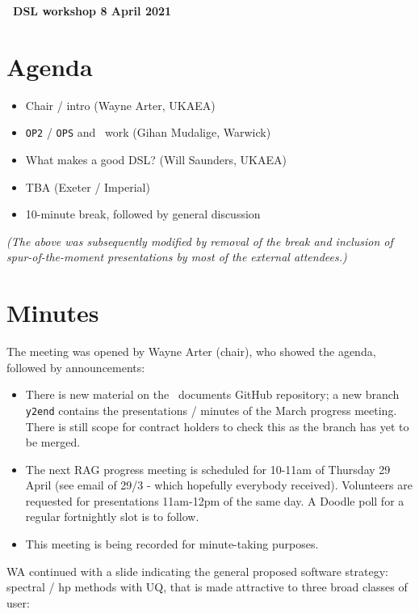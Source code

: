 \documentclass[11pt]{article}
\begin{document}
\vspace{0.2cm}

\centerline{\bf \large \textbf{\nep\  DSL workshop 8 April 2021}}

\section{Agenda}

\begin{itemize}
\item Chair / intro (Wayne Arter, UKAEA)
\item {\tt OP2} / {\tt OPS} and \nep\  work (Gihan Mudalige, Warwick)
\item What makes a good DSL? (Will Saunders, UKAEA)
\item TBA (Exeter / Imperial)
\item 10-minute break, followed by general discussion
\end{itemize}
\emph{(The above was subsequently modified by removal of the break and
inclusion of spur-of-the-moment
presentations by most of the external attendees.)}

\section{Minutes}

The meeting was opened by Wayne Arter (chair), who showed the agenda, followed 
by announcements:

\begin{itemize}
\item There is new material on the \nep\  documents GitHub repository; a new 
branch {\tt y2end} contains the presentations / minutes of the March progress 
meeting.  There is still scope for contract holders to check this as the branch 
has yet to be merged.
\item The next RAG progress meeting is scheduled for 10-11am of Thursday 29 
April (see email of 29/3 - which hopefully everybody received).  Volunteers are 
requested for presentations 11am-12pm of the same day.  A Doodle poll for a 
regular fortnightly slot is to follow.
\item This meeting is being recorded for minute-taking purposes.
\end{itemize}

WA continued with a slide indicating the general proposed software strategy: 
spectral / hp methods with UQ, that is made attractive to three broad classes 
of user:
\end{document}
